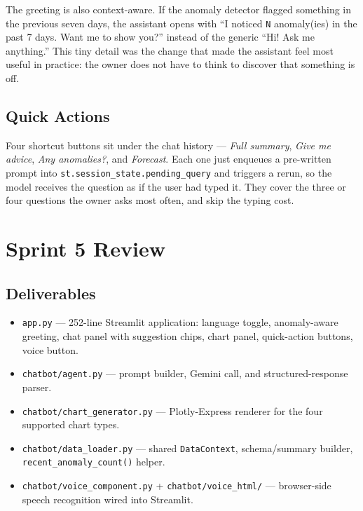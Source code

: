 The greeting is also context-aware. If the anomaly detector flagged
something in the previous seven days, the assistant opens with
``I noticed \texttt{N} anomaly(ies) in the past 7 days. Want me to show
you?'' instead of the generic ``Hi! Ask me anything.'' This tiny detail
was the change that made the assistant feel most useful in practice:
the owner does not have to think to discover that something is off.

\subsection{Quick Actions}

Four shortcut buttons sit under the chat history --- \textit{Full
summary}, \textit{Give me advice}, \textit{Any anomalies?}, and
\textit{Forecast}. Each one just enqueues a pre-written prompt into
\texttt{st.session\_state.pending\_query} and triggers a rerun, so the
model receives the question as if the user had typed it. They cover the
three or four questions the owner asks most often, and skip the typing
cost.

\section{Sprint 5 Review}

\subsection{Deliverables}

\begin{itemize}[noitemsep]
  \item \texttt{app.py} --- 252-line Streamlit application: language
        toggle, anomaly-aware greeting, chat panel with suggestion
        chips, chart panel, quick-action buttons, voice button.
  \item \texttt{chatbot/agent.py} --- prompt builder, Gemini call, and
        structured-response parser.
  \item \texttt{chatbot/chart\_generator.py} --- Plotly-Express
        renderer for the four supported chart types.
  \item \texttt{chatbot/data\_loader.py} --- shared
        \texttt{DataContext}, schema/summary builder,
        \texttt{recent\_anomaly\_count()} helper.
  \item \texttt{chatbot/voice\_component.py} +
        \texttt{chatbot/voice\_html/} --- browser-side speech
        recognition wired into Streamlit.
\end{itemize}

